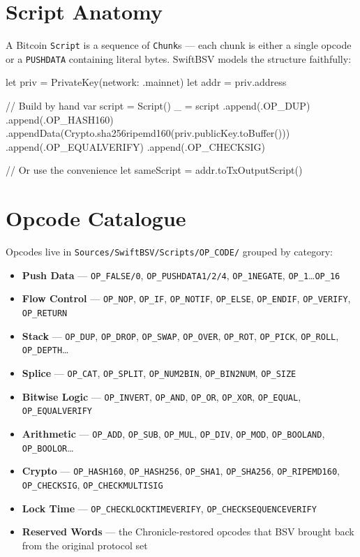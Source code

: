 \documentclass[a4paper, 11pt, openany]{book}
\begin{document}
\section{Script Anatomy}

A Bitcoin \texttt{Script} is a sequence of \texttt{Chunk}s --- each chunk is either a single opcode or a \texttt{PUSHDATA} containing literal bytes. SwiftBSV models the structure faithfully:

\begin{forthbox}
let priv = PrivateKey(network: .mainnet)
let addr = priv.address

// Build by hand
var script = Script()
_ = script
    .append(.OP_DUP)
    .append(.OP_HASH160)
    .appendData(Crypto.sha256ripemd160(priv.publicKey.toBuffer()))
    .append(.OP_EQUALVERIFY)
    .append(.OP_CHECKSIG)

// Or use the convenience
let sameScript = addr.toTxOutputScript()
\end{forthbox}

\section{Opcode Catalogue}

Opcodes live in \texttt{Sources/SwiftBSV/Scripts/OP\_CODE/} grouped by category:

\begin{itemize}
\item \textbf{Push Data} --- \texttt{OP\_FALSE/0}, \texttt{OP\_PUSHDATA1/2/4}, \texttt{OP\_1NEGATE}, \texttt{OP\_1}\ldots\texttt{OP\_16}
\item \textbf{Flow Control} --- \texttt{OP\_NOP}, \texttt{OP\_IF}, \texttt{OP\_NOTIF}, \texttt{OP\_ELSE}, \texttt{OP\_ENDIF}, \texttt{OP\_VERIFY}, \texttt{OP\_RETURN}
\item \textbf{Stack} --- \texttt{OP\_DUP}, \texttt{OP\_DROP}, \texttt{OP\_SWAP}, \texttt{OP\_OVER}, \texttt{OP\_ROT}, \texttt{OP\_PICK}, \texttt{OP\_ROLL}, \texttt{OP\_DEPTH}\ldots
\item \textbf{Splice} --- \texttt{OP\_CAT}, \texttt{OP\_SPLIT}, \texttt{OP\_NUM2BIN}, \texttt{OP\_BIN2NUM}, \texttt{OP\_SIZE}
\item \textbf{Bitwise Logic} --- \texttt{OP\_INVERT}, \texttt{OP\_AND}, \texttt{OP\_OR}, \texttt{OP\_XOR}, \texttt{OP\_EQUAL}, \texttt{OP\_EQUALVERIFY}
\item \textbf{Arithmetic} --- \texttt{OP\_ADD}, \texttt{OP\_SUB}, \texttt{OP\_MUL}, \texttt{OP\_DIV}, \texttt{OP\_MOD}, \texttt{OP\_BOOLAND}, \texttt{OP\_BOOLOR}\ldots
\item \textbf{Crypto} --- \texttt{OP\_HASH160}, \texttt{OP\_HASH256}, \texttt{OP\_SHA1}, \texttt{OP\_SHA256}, \texttt{OP\_RIPEMD160}, \texttt{OP\_CHECKSIG}, \texttt{OP\_CHECKMULTISIG}
\item \textbf{Lock Time} --- \texttt{OP\_CHECKLOCKTIMEVERIFY}, \texttt{OP\_CHECKSEQUENCEVERIFY}
\item \textbf{Reserved Words} --- the Chronicle-restored opcodes that BSV brought back from the original protocol set
\end{itemize}
\end{document}
